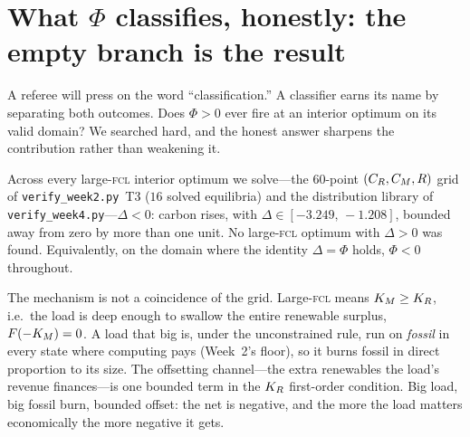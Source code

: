 \section{What $\Phi$ classifies, honestly: the empty branch is the result}\label{r1w4-sec:emptybranch}

A referee will press on the word ``classification.'' A classifier earns its name by
separating both outcomes. Does $\Phi>0$ ever fire at an interior optimum on its valid domain?
We searched hard, and the honest answer sharpens the contribution rather than weakening it.

\begin{proposition}
\label{r1w4-prop:alwaysup}
Across every large-\textsc{fcl} interior optimum we solve---the $60$-point
$(C_R,C_M,R)$ grid of \texttt{verify\_week2.py}~T3 ($16$ solved equilibria) and the
distribution library of \texttt{verify\_week4.py}---$\Delta<0$: carbon rises, with
$\Delta\in[-3.249,\,-1.208]$, bounded away from zero by more than one unit. No large-\textsc{fcl}
optimum with $\Delta>0$ was found. Equivalently, on the domain where the identity
$\Delta=\Phi$ holds, $\Phi<0$ throughout.
\end{proposition}

The mechanism is not a coincidence of the grid. Large-\textsc{fcl} means $K_M\ge K_R$, i.e.\
the load is deep enough to swallow the entire renewable surplus, $F(-K_M)=0$. A load that big
is, under the unconstrained rule, run on \emph{fossil} in every state where computing pays
(Week~2's floor), so it burns fossil in direct proportion to its size. The offsetting
channel---the extra renewables the load's revenue finances---is one bounded term in the $K_R$
first-order condition. Big load, big fossil burn, bounded offset: the net is negative, and
the more the load matters economically the more negative it gets.


